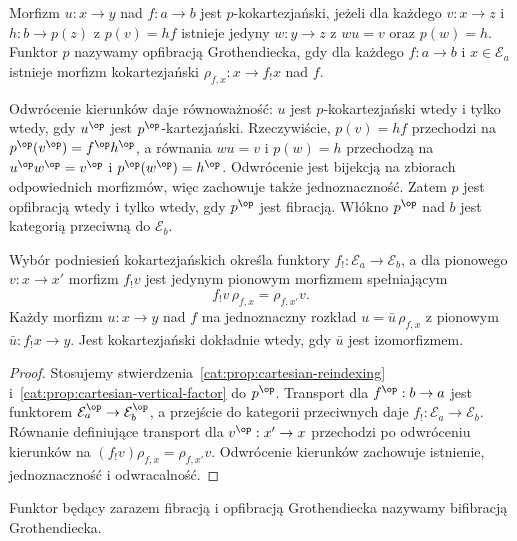 \begin{definicja}\label{cat:def:ordinary-cocartesian-arrow}
Morfizm $u:x\to y$ nad $f:a\to b$ jest $p$-kokartezjański, jeżeli dla każdego $v:x\to z$ i $h:b\to p(z)$ z $p(v)=hf$ istnieje jedyny $w:y\to z$ z $wu=v$ oraz $p(w)=h$. Funktor $p$ nazywamy opfibracją Grothendiecka, gdy dla każdego $f:a\to b$ i $x\in\mathcal E_a$ istnieje morfizm kokartezjański $\rho_{f,x}:x\to f_!x$ nad $f$.
\end{definicja}
Odwrócenie kierunków daje równoważność: $u$ jest $p$-kokartezjański wtedy i tylko wtedy, gdy $u^{\op}$ jest $p^{\op}$-kartezjański. Rzeczywiście, $p(v)=hf$ przechodzi na $p^{\op}(v^{\op})=f^{\op}h^{\op}$, a równania $wu=v$ i $p(w)=h$ przechodzą na $u^{\op}w^{\op}=v^{\op}$ i $p^{\op}(w^{\op})=h^{\op}$. Odwrócenie jest bijekcją na zbiorach odpowiednich morfizmów, więc zachowuje także jednoznaczność. Zatem $p$ jest opfibracją wtedy i tylko wtedy, gdy $p^{\op}$ jest fibracją. Włókno $p^{\op}$ nad $b$ jest kategorią przeciwną do $\mathcal E_b$.

\begin{wniosek}\label{cat:cor:cocartesian-reindexing}
Wybór podniesień kokartezjańskich określa funktory $f_!:\mathcal E_a\to\mathcal E_b$, a dla pionowego $v:x\to x'$ morfizm $f_!v$ jest jedynym pionowym morfizmem spełniającym
\[
 f_!v\,\rho_{f,x}=\rho_{f,x'}v.
\]
Każdy morfizm $u:x\to y$ nad $f$ ma jednoznaczny rozkład $u=\bar u\,\rho_{f,x}$ z pionowym $\bar u:f_!x\to y$. Jest kokartezjański dokładnie wtedy, gdy $\bar u$ jest izomorfizmem.
\end{wniosek}
\begin{proof}
Stosujemy stwierdzenia~\ref{cat:prop:cartesian-reindexing} i~\ref{cat:prop:cartesian-vertical-factor} do $p^{\op}$. Transport dla $f^{\op}:b\to a$ jest funktorem $\mathcal E_a^{\op}\to\mathcal E_b^{\op}$, a przejście do kategorii przeciwnych daje $f_!:\mathcal E_a\to\mathcal E_b$. Równanie definiujące transport dla $v^{\op}:x'\to x$ przechodzi po odwróceniu kierunków na $(f_!v)\rho_{f,x}=\rho_{f,x'}v$. Odwrócenie kierunków zachowuje istnienie, jednoznaczność i odwracalność.
\end{proof}

\begin{definicja}\label{cat:def:grothendieck-bifibration}
Funktor będący zarazem fibracją i opfibracją Grothendiecka nazywamy bifibracją Grothendiecka.
\end{definicja}

